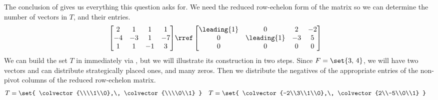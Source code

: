 The conclusion of  gives us everything this question asks for.  We need the reduced row-echelon form of the matrix so we can determine the number of vectors in $T$, and their entries.
\begin{align*}
\begin{bmatrix}
 2 & 1 & 1 & 1 \\
 -4 & -3 & 1 & -7 \\
 1 & 1 & -1 & 3
\end{bmatrix}
&\rref
\begin{bmatrix}
 \leading{1} & 0 & 2 & -2 \\
 0 & \leading{1} & -3 & 5 \\
 0 & 0 & 0 & 0
\end{bmatrix}
\end{align*}
%
We can build the set $T$ in immediately via , but we will illustrate its construction in two steps.  Since $F=\set{3,\,4}$, we will have two vectors and can distribute strategically placed ones, and many zeros.  Then we distribute the negatives of the appropriate entries of the non-pivot columns of the reduced row-echelon matrix. 
%
\begin{align*}
T&=\set{
\colvector{\\\\1\\0},\,
\colvector{\\\\0\\1}
}
&
T&=\set{
\colvector{-2\\3\\1\\0},\,
\colvector{2\\-5\\0\\1}
}
\end{align*}
